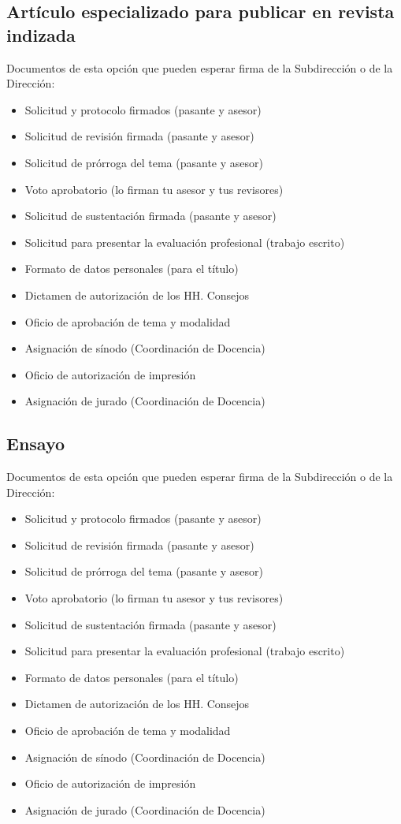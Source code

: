 \subsection{Artículo especializado para publicar en revista indizada}
Documentos de esta opción que pueden esperar firma de la Subdirección o de la Dirección:
\begin{itemize}
  \item Solicitud y protocolo firmados (pasante y asesor)
  \item Solicitud de revisión firmada (pasante y asesor)
  \item Solicitud de prórroga del tema (pasante y asesor)
  \item Voto aprobatorio (lo firman tu asesor y tus revisores)
  \item Solicitud de sustentación firmada (pasante y asesor)
  \item Solicitud para presentar la evaluación profesional (trabajo escrito)
  \item Formato de datos personales (para el título)
  \item Dictamen de autorización de los HH. Consejos
  \item Oficio de aprobación de tema y modalidad
  \item Asignación de sínodo (Coordinación de Docencia)
  \item Oficio de autorización de impresión
  \item Asignación de jurado (Coordinación de Docencia)
\end{itemize}
\subsection{Ensayo}
Documentos de esta opción que pueden esperar firma de la Subdirección o de la Dirección:
\begin{itemize}
  \item Solicitud y protocolo firmados (pasante y asesor)
  \item Solicitud de revisión firmada (pasante y asesor)
  \item Solicitud de prórroga del tema (pasante y asesor)
  \item Voto aprobatorio (lo firman tu asesor y tus revisores)
  \item Solicitud de sustentación firmada (pasante y asesor)
  \item Solicitud para presentar la evaluación profesional (trabajo escrito)
  \item Formato de datos personales (para el título)
  \item Dictamen de autorización de los HH. Consejos
  \item Oficio de aprobación de tema y modalidad
  \item Asignación de sínodo (Coordinación de Docencia)
  \item Oficio de autorización de impresión
  \item Asignación de jurado (Coordinación de Docencia)
\end{itemize}
